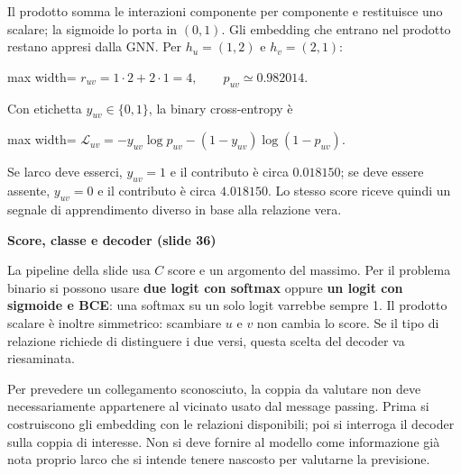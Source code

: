 \documentclass[11pt,a4paper,oneside,openany]{book}
\renewenvironment{quote}{\list{}{\leftmargin=1em\rightmargin=0pt}\item\relax}{\endlist}
\begin{document}
Il prodotto somma le interazioni componente per componente e restituisce uno scalare; la sigmoide lo porta in \((0,1)\). Gli embedding che entrano nel prodotto restano appresi dalla GNN. Per \(h_u=(1,2)\) e \(h_v=(2,1)\):

\begin{center}
\begin{adjustbox}{max width=\linewidth}
$\displaystyle r_{uv}=1\cdot2+2\cdot1=4,\qquad p_{uv}\simeq0.982014.$
\end{adjustbox}
\end{center}

Con etichetta \(y_{uv}\in\{0,1\}\), la binary cross-entropy è

\begin{center}
\begin{adjustbox}{max width=\linewidth}
$\displaystyle \mathcal L_{uv}=-y_{uv}\log p_{uv}-(1-y_{uv})\log(1-p_{uv}).$
\end{adjustbox}
\end{center}

Se l\textquotesingle arco deve esserci, \(y_{uv}=1\) e il contributo è circa \(0.018150\); se deve essere assente, \(y_{uv}=0\) e il contributo è circa \(4.018150\). Lo stesso score riceve quindi un segnale di apprendimento diverso in base alla relazione vera.

\begin{quote}
\textbf{Score, classe e decoder (slide 36)}
\end{quote}

\begin{quote}
La pipeline della slide usa \(C\) score e un argomento del massimo. Per il problema binario si possono usare \textbf{due logit con softmax} oppure \textbf{un logit con sigmoide e BCE}: una softmax su un solo logit varrebbe sempre 1. Il prodotto scalare è inoltre simmetrico: scambiare \(u\) e \(v\) non cambia lo score. Se il tipo di relazione richiede di distinguere i due versi, questa scelta del decoder va riesaminata.
\end{quote}

Per prevedere un collegamento sconosciuto, la coppia da valutare non deve necessariamente appartenere al vicinato usato dal message passing. Prima si costruiscono gli embedding con le relazioni disponibili; poi si interroga il decoder sulla coppia di interesse. Non si deve fornire al modello come informazione già nota proprio l\textquotesingle arco che si intende tenere nascosto per valutarne la previsione.
\end{document}
